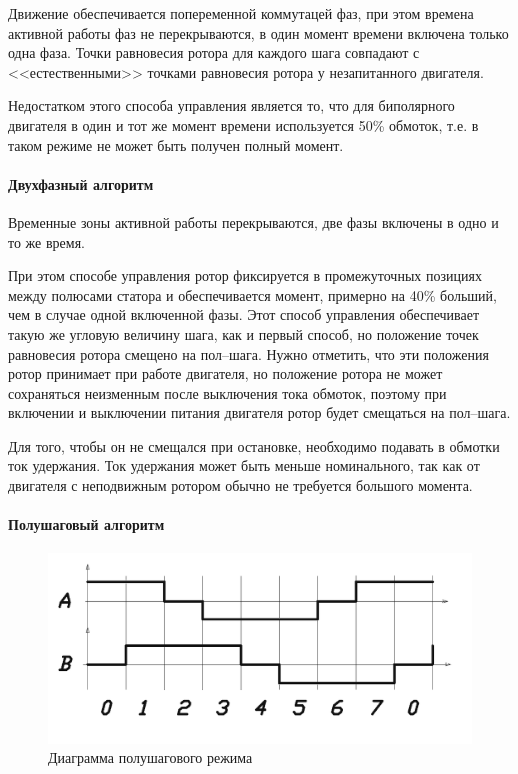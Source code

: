 Движение обеспечивается попеременной коммутацей фаз, при этом времена активной работы фаз
не перекрываются, в один момент времени включена только одна фаза. Точки равновесия
ротора для каждого шага совпадают с <<естественными>> точками равновесия ротора у
незапитанного двигателя.

Недостатком этого способа управления является то, что для биполярного двигателя в
один и тот же момент времени используется 50\% обмоток, т.е. в таком
режиме не может быть получен полный момент.

\paragraph{Двухфазный алгоритм}

Временные зоны активной работы перекрываются, две фазы включены в одно и то же
время.

При этом способе управления ротор фиксируется в промежуточных позициях между
полюсами статора и обеспечивается момент, примерно на 40\% больший, чем в случае
одной включенной фазы. Этот способ управления обеспечивает такую же угловую
величину шага, как и первый способ, но положение точек равновесия ротора смещено
на пол--шага. Нужно отметить, что эти положения ротор принимает при работе двигателя,
но положение ротора не может сохраняться неизменным после выключения тока обмоток,
поэтому при включении и выключении питания двигателя ротор будет смещаться на
пол--шага.

Для того, чтобы он не смещался при остановке, необходимо подавать в обмотки ток
удержания. Ток удержания может быть меньше номинального, так как от двигателя с
неподвижным ротором обычно не требуется большого момента.

\paragraph{Полушаговый алгоритм}

\begin{figure}
    \centering
    \includegraphics[width=0.8\linewidth, keepaspectratio]
                    {./src/pictures/control_algo/half_phase_algo}
    \caption{Диаграмма полушагового режима}
    \label{pic_half_phase_algo}
\end{figure}

